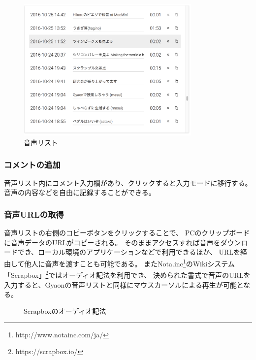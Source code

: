 \begin{figure}[H]
\centering
\includegraphics[width=9cm]{images/list.png}
\caption{音声リスト}
\label{list}
\end{figure}

\subsubsection{コメントの追加}
音声リスト内にコメント入力欄があり、クリックすると入力モードに移行する。
音声の内容などを自由に記録することができる。

\subsubsection{音声URLの取得}
音声リストの右側のコピーボタンをクリックすることで、
PCのクリップボードに音声データのURLがコピーされる。
そのままアクセスすれば音声をダウンロードでき、ローカル環境のアプリケーションなどで利用できるほか、
URLを経由して他人に音声を渡すことも可能である。
またNota.inc\footnote{\textsf{http://www.notainc.com/ja/}}のWikiシステム
「Scrapbox」\footnote{\textsf{https://scrapbox.io/}}ではオーディオ記法を利用でき、
決められた書式で音声のURLを入力すると、Gyaonの音声リストと同様にマウスカーソルによる再生が可能となる。

\begin{figure}[H]
\centering
{}
\caption{Scrapboxのオーディオ記法}
\label{scrapbox}
\end{figure}

